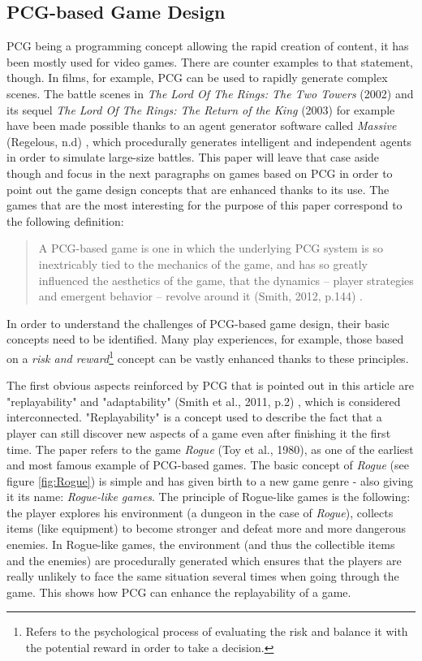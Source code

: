 \subsection{PCG-based Game Design}
PCG being a programming concept allowing the rapid creation of content, it has been mostly used for video games. There are counter examples to that statement, though. In films, for example, PCG can be used to rapidly generate complex scenes. The battle scenes in \textit{The Lord Of The Rings: The Two Towers} (2002) \cite{film:lotr2} and its sequel \textit{The Lord Of The Rings: The Return of the King} (2003) \cite{film:lotr3} for example have been made possible thanks to an agent generator software called \textit{Massive} (Regelous, n.d) \cite{soft:massive}, which procedurally generates intelligent and independent agents in order to simulate large-size battles. This paper will leave that case aside though and focus in the next paragraphs on games based on PCG in order to point out the game design concepts that are enhanced thanks to its use. The games that are the most interesting for the purpose of this paper correspond to the following definition:

\begin{quotation}
A PCG-based game is one in which the underlying PCG system is so inextricably tied to the mechanics of the game, and has so greatly influenced the aesthetics of the game, that the dynamics – player strategies and emergent behavior – revolve around it (Smith, 2012, p.144) \cite{pdf:smith}.
\end{quotation}

In order to understand the challenges of PCG-based game design, their basic concepts need to be identified. Many play experiences, for example, those based on a \textit{risk and reward}\footnote{Refers to the psychological process of evaluating the risk and balance it with the potential reward in order to take a decision.} concept can be vastly enhanced thanks to these principles. 

The first obvious aspects reinforced by PCG that is pointed out in this article are "replayability" and "adaptability" (Smith et al., 2011, p.2) \cite{pdf:pcgbased}, which is considered interconnected. "Replayability" is a concept used to describe the fact that a player can still discover new aspects of a game even after finishing it the first time. The paper refers to the game \textit{Rogue} (Toy et al., 1980)\cite{game:rogue}, as one of the earliest and most famous example of PCG-based games. The basic concept of \textit{Rogue} (see figure \ref{fig:Rogue}) is simple and has given birth to a new game genre - also giving it its name: \textit{Rogue-like games}. The principle of Rogue-like games is the following: the player explores his environment (a dungeon in the case of \textit{Rogue}), collects items (like equipment) to become stronger and defeat more and more dangerous enemies. In Rogue-like games, the environment (and thus the collectible items and the enemies) are procedurally generated which ensures that the players are really unlikely to face the same situation several times when going through the game. This shows how PCG can enhance the replayability of a game.

